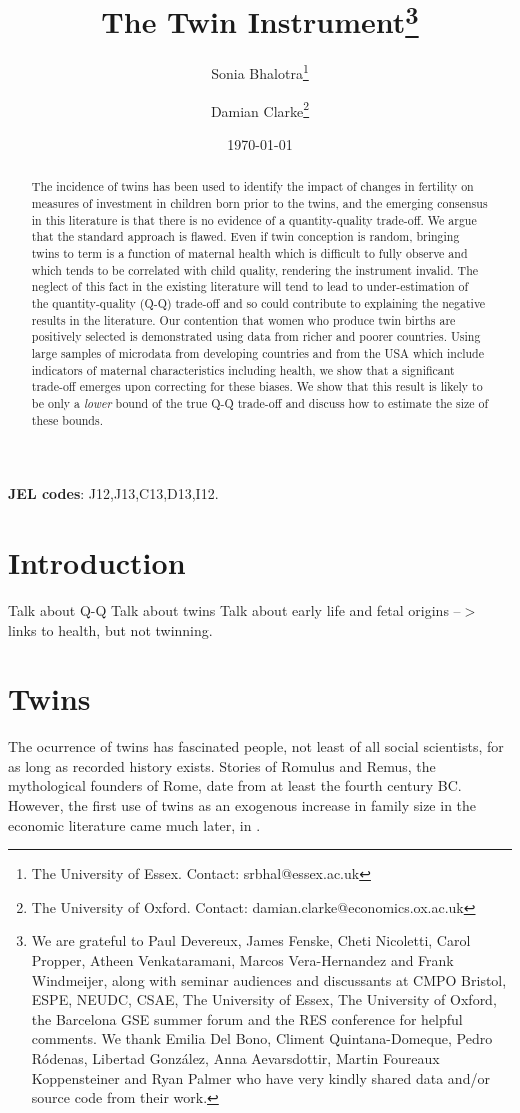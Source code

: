 \documentclass[subeqn]{article}
\title{The Twin Instrument\footnote{We are grateful to Paul Devereux, James 
Fenske, Cheti Nicoletti, Carol Propper, Atheen Venkataramani, Marcos 
Vera-Hernandez and Frank Windmeijer, along with seminar audiences and discussants 
at CMPO Bristol, ESPE, NEUDC, CSAE, The University of Essex, The University of 
Oxford, the Barcelona GSE summer forum and the RES conference for helpful 
comments.  We thank Emilia Del Bono, Climent Quintana-Domeque, Pedro R\'odenas, 
Libertad Gonz\'alez, Anna Aevarsdottir, Martin Foureaux Koppensteiner and Ryan 
Palmer who have very kindly shared data and/or source code from their work.}}
\author{Sonia Bhalotra\thanks{The University of Essex.
Contact: srbhal@essex.ac.uk} 
\and Damian Clarke\thanks{The University of Oxford. 
Contact: damian.clarke@economics.ox.ac.uk}}
\date{\today}
\begin{document}
\begin{spacing}{1.4}

\maketitle
\begin{abstract}
 The incidence of twins has been used to identify the impact of changes in 
 fertility on measures of investment in children born prior to the twins, and
 the emerging consensus in this literature is that there is no evidence of a
 quantity-quality trade-off. We argue that the standard approach is flawed.
 Even if twin conception is random, bringing twins to term is a function of
 maternal health which is difficult to fully observe and which tends to be
 correlated with child quality, rendering the instrument invalid. The neglect
 of this fact in the existing literature will tend to lead to under-estimation of 
 the quantity-quality (Q-Q) trade-off and so could contribute to explaining the 
 negative results in the literature. Our contention that women who produce twin 
 births are positively selected is demonstrated using data from richer and poorer
 countries. Using large samples of microdata from developing countries and from 
 the USA which include indicators of maternal characteristics including health, 
 we show that a significant trade-off emerges upon correcting for these biases. 
 We show that this result is likely to be only a \emph{lower} bound of the true
 Q-Q trade-off and discuss how to estimate the size of these bounds.
\\
\end{abstract}
\hspace{4mm}\textbf{\small JEL codes}: J12,J13,C13,D13,I12. \\

\newpage
\section{Introduction}                             \label{TWINscn:intro}

Talk about Q-Q
Talk about twins
Talk about early life and fetal origins --$>$ links to health, but not twinning.

\section{Twins}                                    \label{TWINscn:literature}
The ocurrence of twins has fascinated people, not least of all social 
scientists, for as long as recorded history exists. Stories of Romulus and 
Remus, the mythological founders of Rome, date from at least the fourth century 
BC. However, the first use of twins as an exogenous increase in family size in 
the economic literature came much later, in \citet{RosenzweigWolpin1980}.


\end{spacing}
\end{document}
